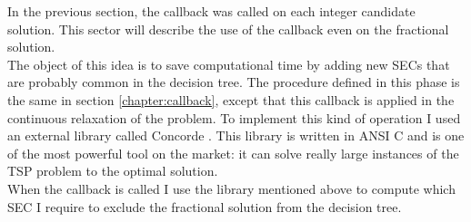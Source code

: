 In the previous section, the callback was called on each integer candidate solution. This sector will describe the use of the callback even on the fractional solution.\\
The object of this idea is to save computational time by adding new SECs that are probably common in the decision tree. The procedure defined in this phase is the same in section \ref{chapter:callback}, except that this callback is applied in the continuous relaxation of the problem.
To implement this kind of operation I used an external library called Concorde \cite{concorde}. This library is written in ANSI C and is one of the most powerful tool on the market: it can solve really large instances of the TSP problem to the optimal solution.\\
When the callback is called I use the library mentioned above to compute which SEC I require to exclude the fractional solution from the decision tree.